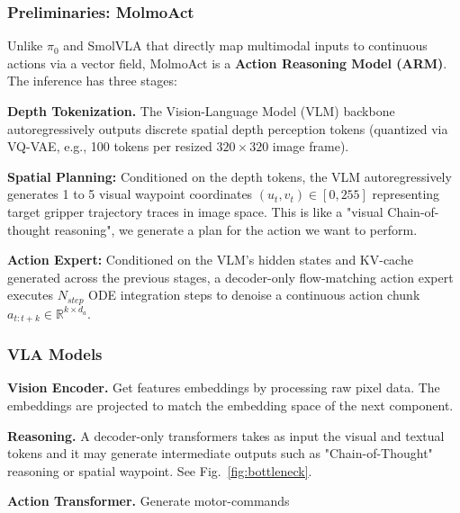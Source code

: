 \subsubsection{Preliminaries: MolmoAct}

Unlike $\pi_0$ and SmolVLA that directly map multimodal inputs to continuous actions via a vector field, MolmoAct \cite{fang2026molmoact2actionreasoningmodels} is a \textbf{Action Reasoning Model (ARM)}. The inference has three stages:
\begin{dashlist}
    \item \textbf{Depth Tokenization.} The Vision-Language Model (VLM) backbone autoregressively outputs discrete spatial depth perception tokens (quantized via VQ-VAE, e.g., 100 tokens per resized $320\times320$ image frame).
    \item \textbf{Spatial Planning:} Conditioned on the depth tokens, the VLM autoregressively generates 1 to 5 visual waypoint coordinates $(u_t, v_t) \in [0, 255]$ representing target gripper trajectory traces in image space. This is like a "visual Chain-of-thought reasoning", we generate a plan for the action we want to perform.
    \item \textbf{Action Expert:} Conditioned on the VLM's hidden states and KV-cache generated across the previous stages, a decoder-only flow-matching action expert executes $N_{step}$ ODE integration steps to denoise a continuous action chunk $a_{t:t+k} \in \mathbb{R}^{k \times d_a}$.
\end{dashlist}

\subsubsection{VLA Models}
\begin{dashlist}
    \item \textbf{Vision Encoder.} Get features embeddings by processing raw pixel data. The embeddings are projected to match the embedding space of the next component.
    \item \textbf{Reasoning.} A decoder-only transformers takes as input the visual and textual tokens and it may generate intermediate outputs such as "Chain-of-Thought" reasoning or spatial waypoint. See Fig.~\ref{fig:bottleneck}.
    \item \textbf{Action Transformer.} Generate motor-commands
\end{dashlist}

